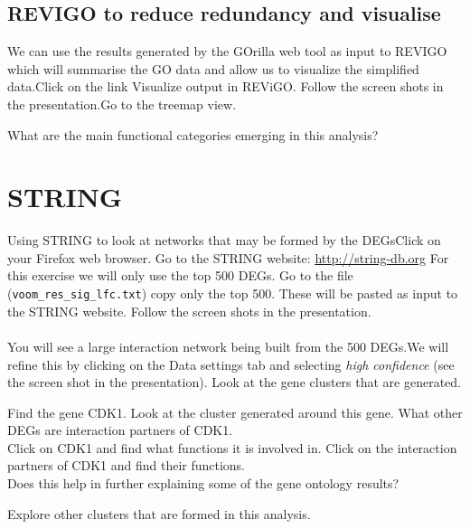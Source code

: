 \subsection{REVIGO to reduce redundancy and visualise}

We can use the results generated by the GOrilla web tool as input to REVIGO which will summarise the GO data and allow us to visualize the simplified data.Click on the link Visualize output in REViGO. Follow the screen shots in the presentation.Go to the treemap view.

\begin{questions}
What are the main functional categories emerging in this analysis?
\begin{answer}

\end{answer}

\section{STRING}

Using STRING to look at networks that may be formed by the DEGsClick on your Firefox web browser.  Go to the STRING website: \url{http://string-db.org}
For this exercise we will only use the top 500 DEGs. Go to the file (\texttt{voom\_res\_sig\_lfc.txt}) copy only the top 500. These will be pasted as input to the STRING website. Follow the screen shots in the presentation.\\\\You will see a large interaction network being built from the 500 DEGs.We will refine this by clicking on the Data settings tab and selecting \emph{high confidence} (see the screen shot in the presentation).
Look at the gene clusters that are generated.
\end{questions}

\begin{questions}
Find the gene CDK1. Look at the cluster generated around this gene. What other DEGs are interaction partners of CDK1.\\
Click on CDK1 and find what functions it is involved in. Click on the interaction partners of CDK1 and find their functions. \\
Does this help in further explaining some of the gene ontology results?
\begin{answer}
Explore other clusters that are formed in this analysis.
\end{answer}
 
\end{questions}

